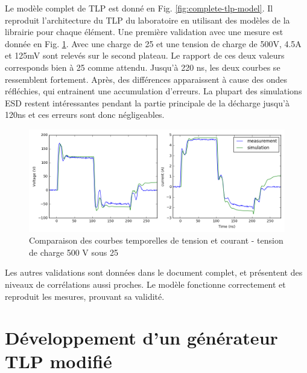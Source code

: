 Le modèle complet de TLP est donné en Fig. \ref{fig:complete-tlp-model}.
Il reproduit l'architecture du TLP du laboratoire en utilisant des modèles de la librairie pour chaque élément.
Une première validation avec une mesure est donnée en Fig. \ref{fig:comparison-tlp-load}.
Avec une charge de 25\textOmega{} et une tension de charge de 500V, 4.5A et 125mV sont relevés sur le second plateau.
Le rapport de ces deux valeurs corresponds bien à 25\textOmega{} comme attendu.
Jusqu'à 220 ns, les deux courbes se ressemblent fortement.
Après, des différences apparaissent à cause des ondes réfléchies, qui entrainent une accumulation d'erreurs.
La plupart des simulations ESD restent intéressantes pendant la partie principale de la décharge jusqu'à 120ns et ces erreurs sont donc négligeables.

\begin{figure}[!h]
  \centering
  \includegraphics[width=\textwidth]{src/1/figures/tlp_comparison_R25_500V.png}
  \caption{Comparaison des courbes temporelles de tension et courant - tension de charge 500 V sous 25\textOmega{}}
  \label{fig:comparison-tlp-load}
\end{figure}

Les autres validations sont données dans le document complet, et présentent des niveaux de corrélations aussi proches.
Le modèle fonctionne correctement et reproduit les mesures, prouvant sa validité.

\section{Développement d'un générateur TLP modifié}

